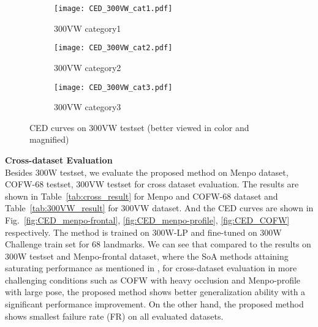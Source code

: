 \documentclass{article}
\begin{document}
  \begin{figure}[ht]
  \begin{center}
    \begin{subfigure}{0.24\textwidth}
      \begin{center}
       \texttt{[image: CED\_300VW\_cat1.pdf]}
      \end{center}
       \caption{300VW category1}
      \label{fig:CED_300vwcat1}
    \end{subfigure}
    \begin{subfigure}{0.24\textwidth}
      \begin{center}
       \texttt{[image: CED\_300VW\_cat2.pdf]}
      \end{center}
       \caption{300VW category2}
      \label{fig:CED_300vwcat2}
    \end{subfigure}
    \begin{subfigure}{0.24\textwidth}
      \begin{center}
       \texttt{[image: CED\_300VW\_cat3.pdf]}
      \end{center}
       \caption{300VW category3}
      \label{fig:CED_300vwcat3}
    \end{subfigure}
  \caption{CED curves on 300VW testset (better viewed in color and magnified)}
  \label{fig:AUC_300vw}
  \end{center}
  \end{figure} 
\textbf{Cross-dataset Evaluation} \\
  Besides 300W testset, we evaluate the proposed method on Menpo dataset, COFW-68 testset, 300VW testset for cross dataset evaluation. The results are shown in Table~\ref{tab:cross_result} for Menpo and COFW-68 dataset and Table~\ref{tab:300VW_result} for 300VW dataset. And the CED curves are shown in Fig.~\ref{fig:CED_menpo-frontal}, \ref{fig:CED_menpo-profile}, \ref{fig:CED_COFW} respectively. The method is trained on 300W-LP and fine-tuned on 300W Challenge train set for 68 landmarks. We can see that compared to the results on 300W testset and Menpo-frontal dataset, where the SoA methods attaining saturating performance as mentioned in \cite{Bulat17FAN}, for cross-dataset evaluation in more challenging conditions such as COFW with heavy occlusion and Menpo-profile with large pose, the proposed method shows better generalization ability with a significant performance improvement. On the other hand, the proposed method shows smallest failure rate (FR) on all evaluated datasets.
  
\end{document}
